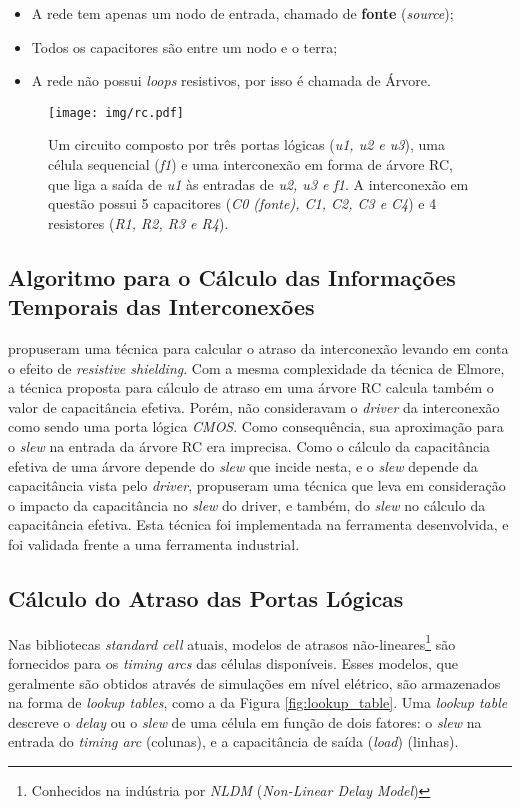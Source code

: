 \documentclass[
	12pt,				%
	openright,			%
	twoside,			%
	a4paper,			%
	english,			%
	french,				%
	spanish,			%
	brazil,				%
	]{abntex2}
\begin{document}
\begin{itemize}
\item A rede tem apenas um nodo de entrada, chamado de \textbf{fonte} (\textit{source});
\item Todos os capacitores são entre um nodo e o terra;
\item A rede não possui \textit{loops} resistivos, por isso é chamada de Árvore.
\end{itemize}

\begin{figure}[ht]
\begin{center}
\texttt{[image: img/rc.pdf]} 
\caption{Um circuito composto por três portas lógicas (\textit{u1, u2 e u3}), uma célula sequencial (\textit{f1}) e uma interconexão em forma de árvore RC, que liga a saída de \textit{u1} às entradas de \textit{u2, u3 e f1}. A interconexão em questão possui 5 capacitores (\textit{C0 (fonte), C1, C2, C3 e C4}) e 4 resistores (\textit{R1, R2, R3 e R4}).}
\label{fig:rc}
\end{center}
\end{figure}

\subsection{Algoritmo para o Cálculo das Informações Temporais das Interconexões}

 propuseram uma técnica para calcular o atraso da interconexão levando em conta o efeito de \textit{resistive shielding}. Com a mesma complexidade da técnica de Elmore, a técnica proposta para cálculo de atraso em uma árvore RC calcula também o valor de capacitância efetiva. Porém,  não consideravam o \textit{driver} da interconexão como sendo uma porta lógica \textit{CMOS}. Como consequência, sua aproximação para o \textit{slew} na entrada da árvore RC era imprecisa. Como o cálculo da capacitância efetiva de uma árvore depende do \textit{slew} que incide nesta, e o \textit{slew} depende da capacitância vista pelo \textit{driver},  propuseram uma técnica que leva em consideração o impacto da capacitância no \textit{slew} do driver, e também, do \textit{slew} no cálculo da capacitância efetiva. Esta técnica foi implementada na ferramenta desenvolvida, e foi validada frente a uma ferramenta industrial.

\subsection{Cálculo do Atraso das Portas Lógicas}
Nas bibliotecas \textit{standard cell} atuais, modelos de atrasos não-lineares\footnote{Conhecidos na indústria por \textit{NLDM} (\textit{Non-Linear Delay Model})} são fornecidos para os \textit{timing arcs} das células disponíveis. Esses modelos, que geralmente são obtidos através de simulações em nível elétrico, são armazenados na forma de \textit{lookup tables}, como a da Figura \ref{fig:lookup_table}. Uma \textit{lookup table} descreve o \textit{delay} ou o \textit{slew} de uma célula em função de dois fatores: o \textit{slew} na entrada do \textit{timing arc} (colunas), e a capacitância de saída (\textit{load}) (linhas).
\end{document}
